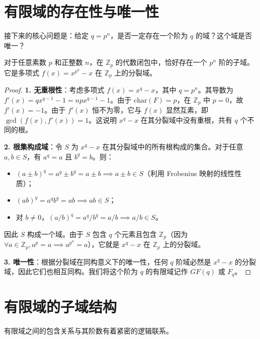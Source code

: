 \documentclass[11pt]{article}
\begin{document}
\section{有限域的存在性与唯一性}

接下来的核心问题是：给定 $q = p^n$，是否一定存在一个阶为 $q$ 的域？这个域是否唯一？

\begin{cntheorem}
    对于任意素数 $p$ 和正整数 $n$，在 $\mathbb{Z}_p$ 的代数闭包中，恰好存在一个 $p^n$ 阶的子域。它是多项式 $f(x) = x^{p^n} - x$ 在 $\mathbb{Z}_p$ 上的分裂域。
\end{cntheorem}

\begin{proof}
    \textbf{1. 无重根性}：考虑多项式 $f(x) = x^q - x$，其中 $q = p^n$。其导数为 $f'(x) = qx^{q-1} - 1 = n p x^{q-1} - 1$。由于 $\text{char}(F) = p$，在 $\mathbb{Z}_p$ 中 $p = 0$，故 $f'(x) = -1$。由于 $f'(x)$ 恒不为零，它与 $f(x)$ 显然互素，即 $\gcd(f(x), f'(x)) = 1$。这说明 $x^q - x$ 在其分裂域中没有重根，共有 $q$ 个不同的根。

    \textbf{2. 根集构成域}：令 $S$ 为 $x^q - x$ 在其分裂域中的所有根构成的集合。对于任意 $a, b \in S$，有 $a^q = a$ 且 $b^q = b$。则：
    \begin{itemize}
        \item $(a \pm b)^q = a^q \pm b^q = a \pm b \implies a \pm b \in S$（利用 Frobenius 映射的线性性质）；
        \item $(ab)^q = a^q b^q = ab \implies ab \in S$；
        \item 对 $b \neq 0$，$(a/b)^q = a^q / b^q = a/b \implies a/b \in S$。
    \end{itemize}
    因此 $S$ 构成一个域。由于 $S$ 包含 $q$ 个元素且包含 $\mathbb{Z}_p$（因为 $\forall a \in \mathbb{Z}_p, a^p = a \implies a^{p^n} = a$），它就是 $x^q - x$ 在 $\mathbb{Z}_p$ 上的分裂域。

    \textbf{3. 唯一性}：根据分裂域在同构意义下的唯一性，任何 $q$ 阶域必然是 $x^q - x$ 的分裂域，因此它们也相互同构。我们将这个阶为 $q$ 的有限域记作 $GF(q)$ 或 $F_q$。
\end{proof}

\section{有限域的子域结构}

有限域之间的包含关系与其阶数有着紧密的逻辑联系。
\end{document}
